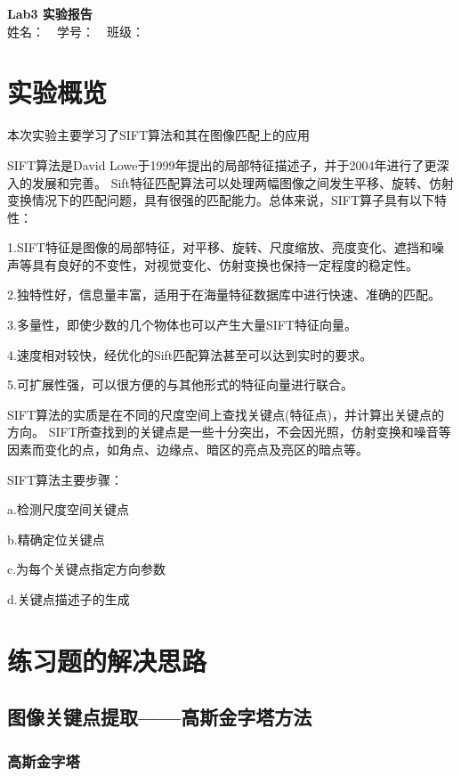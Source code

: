 \documentclass{article}
\begin{document}
\begin{center}
    \Large \textbf{Lab3 实验报告}\\
    \vspace{1em}
    姓名：~~学号：~~班级：
\end{center}

\section{实验概览}

    本次实验主要学习了SIFT算法和其在图像匹配上的应用

    SIFT算法是David Lowe于1999年提出的局部特征描述子，并于2004年进行了更深入的发展和完善。
    Sift特征匹配算法可以处理两幅图像之间发生平移、旋转、仿射变换情况下的匹配问题，具有很强的匹配能力。总体来说，SIFT算子具有以下特性：

    1.SIFT特征是图像的局部特征，对平移、旋转、尺度缩放、亮度变化、遮挡和噪声等具有良好的不变性，对视觉变化、仿射变换也保持一定程度的稳定性。

    2.独特性好，信息量丰富，适用于在海量特征数据库中进行快速、准确的匹配。

    3.多量性，即使少数的几个物体也可以产生大量SIFT特征向量。

    4.速度相对较快，经优化的Sift匹配算法甚至可以达到实时的要求。

    5.可扩展性强，可以很方便的与其他形式的特征向量进行联合。

    SIFT算法的实质是在不同的尺度空间上查找关键点(特征点)，并计算出关键点的方向。
    SIFT所查找到的关键点是一些十分突出，不会因光照，仿射变换和噪音等因素而变化的点，如角点、边缘点、暗区的亮点及亮区的暗点等。

    SIFT算法主要步骤：

a.检测尺度空间关键点

b.精确定位关键点

c.为每个关键点指定方向参数

d.关键点描述子的生成

\section{练习题的解决思路}

\subsection{图像关键点提取——高斯金字塔方法}

\subsubsection{高斯金字塔}
\end{document}
